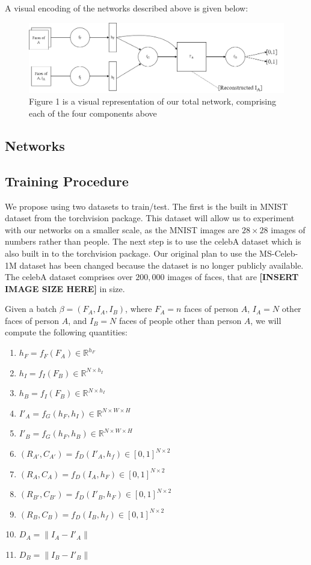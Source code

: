 \documentclass{article}
\begin{document}
A visual encoding of the networks described above is given below:
\begin{figure}
    \centering
    \includegraphics[scale=0.25]{images/OurNetwork.png}
    \caption{Figure 1 is a visual representation of our total network, comprising each of the four components above}
    \label{fig:my_label}
\end{figure}

\subsection{Networks}

\subsection{Training Procedure}

We propose using two datasets to train/test. The first is the built in MNIST dataset from the torchvision package. This dataset will allow us to experiment with our networks on a smaller scale, as the MNIST images are $28 \times 28$ images of numbers rather than people. The next step is to use the celebA dataset which is also built in to the torchvision package. Our original plan to use the MS-Celeb-1M dataset \cite{guo2016ms} has been changed because the dataset is no longer publicly available. The celebA dataset comprises over $200,000$ images of faces, that are \textbf{[INSERT IMAGE SIZE HERE]} in size.

Given a batch $\beta = (F_A, I_A, I_B)$, where $F_A = n$ faces of person $A$, $I_A = N$ other faces of person $A$, and $I_B = N $ faces of people other than person $A$, we will compute the following quantities:
\begin{enumerate}
    \item $h_F = f_F(F_A) \in \mathbb{R}^{h_F}$
    \item $h_I = f_I(F_B) \in \mathbb{R}^{N \times h_I}$
    \item $h_B = f_I(F_B) \in \mathbb{R}^{N \times h_I}$
    \item $I'_A = f_G(h_F, h_I) \in \mathbb{R}^{N \times W \times H}$
    \item $I'_B = f_G(h_F, h_B) \in \mathbb{R}^{N \times W \times H}$
    \item $(R_{A'}, C_{A'}) = f_D(I'_A, h_f) \in [0,1]^{N \times 2}$
    \item $(R_A, C_A) = f_D(I_A, h_F) \in [0,1]^{N \times 2}$
    \item $(R_{B'}, C_{B'}) = f_D(I'_B, h_F) \in [0,1]^{N \times 2}$
    \item $(R_B, C_B) = f_D(I_B, h_f) \in [0,1]^{N \times 2}$
    \item $D_A = \|I_A - I'_A\|$
    \item $D_B = \|I_B - I'_B\|$
\end{enumerate}
\end{document}
